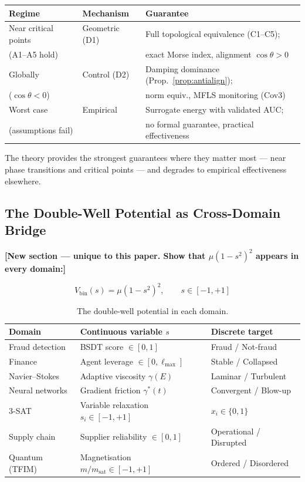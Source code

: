\documentclass[11pt,a4paper]{article}
\begin{document}
\begin{center}
\begin{tabular}{@{}lll@{}}
\toprule
\textbf{Regime} & \textbf{Mechanism} & \textbf{Guarantee} \\
\midrule
Near critical points &
  Geometric (D1) &
  Full topological equivalence (C1--C5); \\
  (A1--A5 hold) & &
  exact Morse index, alignment $\cos\theta > 0$ \\
\addlinespace
Globally &
  Control (D2) &
  Damping dominance (Prop.~\ref{prop:antialign}); \\
  ($\cos\theta < 0$) & &
  norm equiv., MFLS monitoring (Cov3) \\
\addlinespace
Worst case &
  Empirical &
  Surrogate energy with validated AUC; \\
  (assumptions fail) & &
  no formal guarantee, practical effectiveness \\
\bottomrule
\end{tabular}
\end{center}

\noindent
The theory provides the strongest guarantees where they matter
most --- near phase transitions and critical points --- and
degrades to empirical effectiveness elsewhere.

\subsection{The Double-Well Potential as Cross-Domain Bridge}

\textbf{[New section — unique to this paper. Show that $\mu(1-s^2)^2$
appears in every domain:]}

\begin{equation}\label{eq:doublewell}
  V_{\mathrm{bin}}(s) = \mu(1 - s^2)^2, \qquad s \in [-1, +1]
\end{equation}

\begin{table}[H]
\centering
\caption{The double-well potential in each domain.}
\label{tab:doublewell}
\begin{tabular}{@{}lll@{}}
\toprule
\textbf{Domain} & \textbf{Continuous variable $s$} & \textbf{Discrete target} \\
\midrule
Fraud detection &
  BSDT score $\in [0,1]$ &
  Fraud / Not-fraud \\
Finance &
  Agent leverage $\in [0, \ell_{\max}]$ &
  Stable / Collapsed \\
Navier--Stokes &
  Adaptive viscosity $\gamma(E)$ &
  Laminar / Turbulent \\
Neural networks &
  Gradient friction $\gamma^*(t)$ &
  Convergent / Blow-up \\
3-SAT &
  Variable relaxation $s_i \in [-1,+1]$ &
  $x_i \in \{0, 1\}$ \\
Supply chain &
  Supplier reliability $\in [0,1]$ &
  Operational / Disrupted \\
Quantum (TFIM) &
  Magnetisation $m/m_{\mathrm{sat}} \in [-1,+1]$ &
  Ordered / Disordered \\
\bottomrule
\end{tabular}
\end{table}
\end{document}
